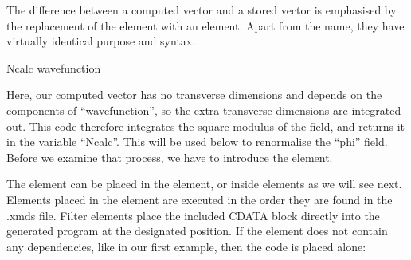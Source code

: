 \documentclass[letterpaper,10pt,english]{sphinxmanual}
\begin{document}
\sphinxAtStartPar
The difference between a computed vector and a stored vector is emphasised by the replacement of the  element with an  element.  Apart from the name, they have virtually identical purpose and syntax.

\begin{sphinxVerbatim}[commandchars=\\\{\}]
   
   Ncalc 
     wavefunction
    \PYG{c+cp}{\PYGZlt{}![CDATA[}
        
    \PYG{c+cp}{]]\PYGZgt{}}
\end{sphinxVerbatim}

\sphinxAtStartPar
Here, our computed vector has no transverse dimensions and depends on the components of “wavefunction”, so the extra transverse dimensions are integrated out.  This code therefore integrates the square modulus of the field, and returns it in the variable “Ncalc”.  This will be used below to renormalise the “phi” field.  Before we examine that process, we have to introduce the  element.

\sphinxAtStartPar
The  element can be placed in the  element, or inside  elements as we will see next.  Elements placed in the  element are executed in the order they are found in the .xmds file.  Filter elements place the included CDATA block directly into the generated program at the designated position.  If the element does not contain any dependencies, like in our first example, then the code is placed alone:
\end{document}
